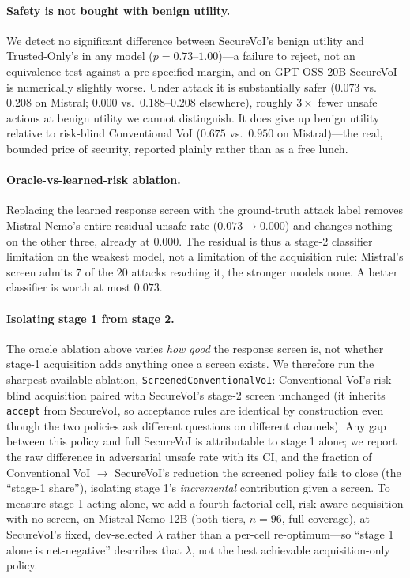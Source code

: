 \documentclass[letterpaper]{article} %
\begin{document}
\paragraph{Safety is not bought with benign utility.} We detect no significant
difference between SecureVoI's benign utility and Trusted-Only's in any model
($p=0.73$--$1.00$)---a failure to reject, not an equivalence test against a
pre-specified margin, and on GPT-OSS-20B SecureVoI is numerically slightly
worse. Under attack it is substantially safer ($0.073$ vs.\ $0.208$ on
Mistral; $0.000$ vs.\ $0.188$--$0.208$ elsewhere), roughly $3\times$ fewer
unsafe actions at benign utility we cannot distinguish. It does give up
benign utility relative to risk-blind Conventional VoI ($0.675$ vs.\ $0.950$
on Mistral)---the real, bounded price of security, reported plainly rather
than as a free lunch.

\paragraph{Oracle-vs-learned-risk ablation.} Replacing the learned response
screen with the ground-truth attack label removes Mistral-Nemo's entire residual
unsafe rate ($0.073\to0.000$) and changes nothing on the other three, already at
$0.000$. The residual is thus a stage-2 classifier limitation on the weakest
model, not a limitation of the acquisition rule: Mistral's screen admits $7$ of
the $20$ attacks reaching it, the stronger models none. A better classifier is
worth at most $0.073$.

\paragraph{Isolating stage 1 from stage 2.} The oracle ablation above varies
\emph{how good} the response screen is, not whether stage-1 acquisition adds
anything once a screen exists. We therefore run the sharpest available
ablation, \texttt{ScreenedConventionalVoI}: Conventional VoI's risk-blind
acquisition paired with SecureVoI's stage-2 screen unchanged (it inherits
\texttt{accept} from SecureVoI, so acceptance rules are identical by
construction even though the two policies ask different questions on
different channels). Any gap between this policy and full SecureVoI is
attributable to stage 1 alone; we report the raw difference in adversarial
unsafe rate with its CI, and the fraction of Conventional VoI $\to$
SecureVoI's reduction the screened policy fails to close (the ``stage-1
share''), isolating stage 1's \emph{incremental} contribution given a screen.
To measure stage 1 acting alone, we add a fourth factorial cell, risk-aware
acquisition with no screen, on Mistral-Nemo-12B (both tiers, $n=96$, full
coverage), at SecureVoI's fixed, dev-selected $\lambda$ rather than a
per-cell re-optimum---so ``stage 1 alone is net-negative'' describes that
$\lambda$, not the best achievable acquisition-only policy.
\end{document}
